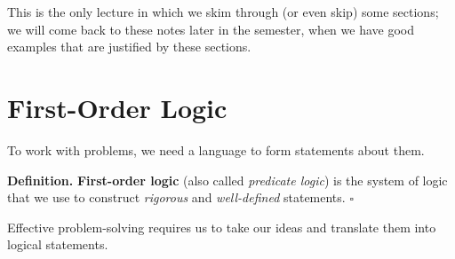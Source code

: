 \documentclass[letterpaper,twoside]{article}
\def\SmallHSpace{\hspace*{1mm}}
\newcommand{\DefinedTerm}[1]{\textbf{#1}}
\newcommand{\Definition}[1]{%
    \emoji{book} \textbf{Definition.}\SmallHSpace #1 \hfill $\square$
}
\begin{document}
\begin{multicols}{2}
This is the only lecture in which we skim through (or even skip) some sections; we will come back to these notes later in the semester, when we have good examples that are justified by these sections.





\section{First-Order Logic}

To work with problems, we need a language to form statements about them.

\Definition
{
    \DefinedTerm{First-order logic} (also called \textit{predicate logic}) is the system of logic that we use to construct \textit{rigorous} and \textit{well-defined} statements.
}

Effective problem-solving requires us to take our ideas and translate them into logical statements.


\end{multicols}
\end{document}

